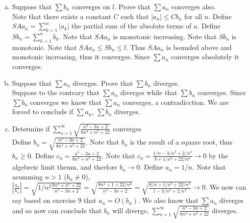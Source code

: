 \documentclass[12pt]{article}
\theoremstyle{homework}
\begin{document}
\begin{enumerate}[a)]
\item
Suppose that $\sum b_n$ converges on $l$. Prove that $\sum a_n$ converges also.\\
Note that there exists a constant $C$ such that $|a_n| \leq Cb_n$ for all $n$.  Define $SAa_n=\sum_{k=1}^n |a_k|$ the partial sum of the absolute terms of $a$.  Define $Sb_n=\sum_{k=1}^n b_k$.  Note that $SAa_n$ is monotonic increasing.  Note that $Sb_n$ is monotonic.  Note that $SAa_n\leq Sb_n\leq l$.  Thus $SAa_n$ is bounded above and monotonic increasing, thus it converges.  Since $\sum a_n$ converges absolutely it converges.
\item
Suppose that $\sum a_n$ diverges. Prove that $\sum b_n$ diverges.\\
Suppose to the contrary that $\sum a_n$ diverges while that $\sum b_n$ converges.  Since $\sum b_n$ converges we know that $\sum a_n$ converges, a contradicction.  We are forced to conclude if $\sum a_n$, $\sum b_n$ diverges.
\item
Determine if $\sum_{n=1}^\infty \sqrt{\frac{n^3-3n+2}{8n^4+n^2+22}}$ converges\\
Define $b_n=\sqrt{\frac{n^3-3n+2}{8n^4+n^2+22}}$.  Note that $b_n$ is the result of a square root, thus $b_n\geq 0$.  Define $c_n=\frac{n^3-3n+2}{8n^4+n^2+22}$.  Note that $c_n=\frac{1/n-3/n^3+2/n^4}{8+1/n^2+22/n^4}\rightarrow 0$ by the algebreic limit theum, and therfore $b_n\rightarrow 0$.  Define $a_n=1/n$.  Note that asumming $n>1$ ($b_n\neq 0$), $|\frac{a_n}{b_n}|=\sqrt{1/n^2\frac{8n^4+n^2+22}{n^3-3n+2}}=\sqrt{\frac{8n^2+1+22/n^2}{n^3-3n+2}}=\sqrt{\frac{8/n+1/n^3+22/n^5}{1-3/n^2+2/n^3}}\rightarrow 0$.  We now can say based on exercise 9 that $a_n=O(b_n)$.  We also know that $\sum a_n$ diverges and so now can conclude that $b_n$ will diverge, $\sum_{n=1}^\infty \sqrt{\frac{n^3-3n+2}{8n^4+n^2+22}}$ diverges.
\end{enumerate}
\end{document}
